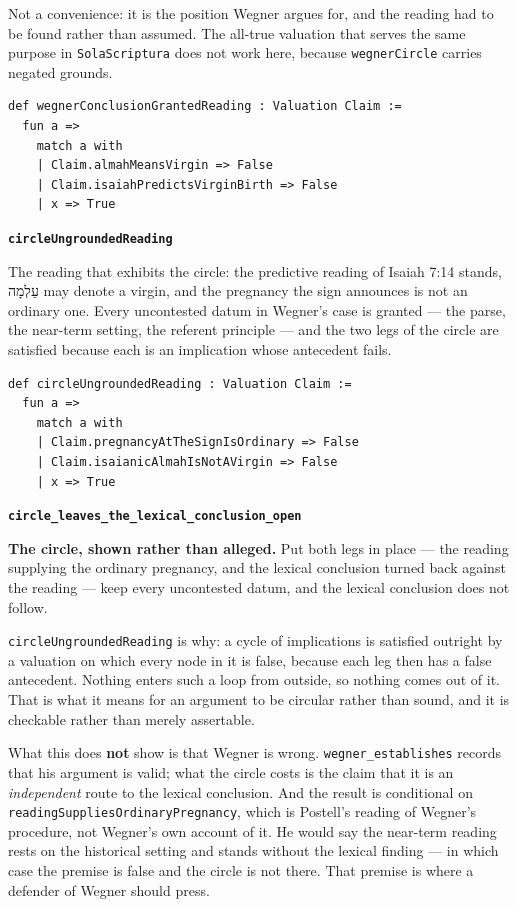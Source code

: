 \documentclass[11pt]{article}
\begin{document}
Not a convenience: it is the position Wegner argues for, and the reading had to be found rather than assumed. The all-true valuation that serves the same purpose in \texttt{Sola\allowbreak{}Scriptura} does not work here, because \texttt{wegner\allowbreak{}Circle} carries negated grounds.

{\small\begin{verbatim}
def wegnerConclusionGrantedReading : Valuation Claim :=
  fun a =>
    match a with
    | Claim.almahMeansVirgin => False
    | Claim.isaiahPredictsVirginBirth => False
    | x => True
\end{verbatim}}
\par\medskip\noindent\textbf{\texttt{circle\allowbreak{}Ungrounded\allowbreak{}Reading}}\par\nobreak\noindent
The reading that exhibits the circle: the predictive reading of Isaiah 7:14 stands, עַלְמָה may denote a virgin, and the pregnancy the sign announces is not an ordinary one. Every uncontested datum in Wegner’s case is granted — the parse, the near-term setting, the referent principle — and the two legs of the circle are satisfied because each is an implication whose antecedent fails.

{\small\begin{verbatim}
def circleUngroundedReading : Valuation Claim :=
  fun a =>
    match a with
    | Claim.pregnancyAtTheSignIsOrdinary => False
    | Claim.isaianicAlmahIsNotAVirgin => False
    | x => True
\end{verbatim}}
\par\medskip\noindent\textbf{\texttt{circle\_\allowbreak{}leaves\_\allowbreak{}the\_\allowbreak{}lexical\_\allowbreak{}conclusion\_\allowbreak{}open}}\par\nobreak\noindent
\textbf{The circle, shown rather than alleged.} Put both legs in place — the reading supplying the ordinary pregnancy, and the lexical conclusion turned back against the reading — keep every uncontested datum, and the lexical conclusion does not follow.

\texttt{circle\allowbreak{}Ungrounded\allowbreak{}Reading} is why: a cycle of implications is satisfied outright by a valuation on which every node in it is false, because each leg then has a false antecedent. Nothing enters such a loop from outside, so nothing comes out of it. That is what it means for an argument to be circular rather than sound, and it is checkable rather than merely assertable.

What this does \textbf{not} show is that Wegner is wrong. \texttt{wegner\_\allowbreak{}establishes} records that his argument is valid; what the circle costs is the claim that it is an \emph{independent} route to the lexical conclusion. And the result is conditional on \texttt{reading\allowbreak{}Supplies\allowbreak{}Ordinary\allowbreak{}Pregnancy}, which is Postell’s reading of Wegner’s procedure, not Wegner’s own account of it. He would say the near-term reading rests on the historical setting and stands without the lexical finding — in which case the premise is false and the circle is not there. That premise is where a defender of Wegner should press.
\end{document}
